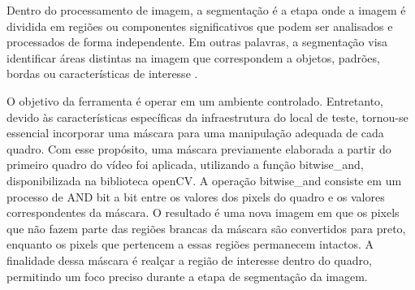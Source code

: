 Dentro do processamento de imagem, a segmentação é a etapa onde a imagem é dividida em regiões ou componentes significativos que podem ser analisados e processados de forma independente. Em outras palavras, a segmentação visa identificar áreas distintas na imagem que correspondem a objetos, padrões, bordas ou características de interesse \cite{imagemMonocromatica}.

O objetivo da ferramenta é operar em um ambiente controlado. Entretanto, devido às características específicas da infraestrutura do local de teste, tornou-se essencial incorporar uma máscara para uma manipulação adequada de cada quadro. Com esse propósito, uma máscara previamente elaborada a partir do primeiro quadro do vídeo foi aplicada, utilizando a função bitwise\_and, disponibilizada na biblioteca \ac{openCV}. A operação bitwise\_and consiste em um processo de AND bit a bit entre os valores dos pixels do quadro e os valores correspondentes da máscara. O resultado é uma nova imagem em que os pixels que não fazem parte das regiões brancas da máscara são convertidos para preto, enquanto os pixels que pertencem a essas regiões permanecem intactos. A finalidade dessa máscara é realçar a região de interesse dentro do quadro, permitindo um foco preciso durante a etapa de segmentação da imagem.
